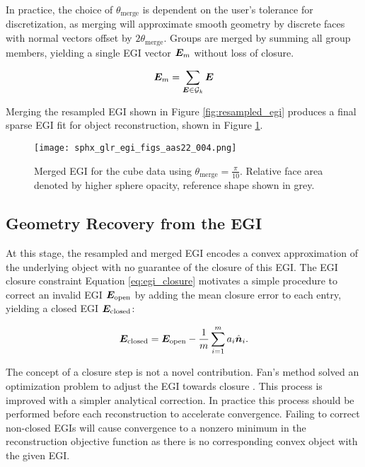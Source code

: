 In practice, the choice of $\theta_\mathrm{merge}$ is dependent on the user's tolerance for discretization, as merging will approximate smooth geometry by discrete faces with normal vectors offset by $2\theta_\mathrm{merge}$. Groups are merged by summing all group members, yielding a single EGI vector $\bm{E}_m$ without loss of closure. 

\begin{equation} \label{eq:fixing_egi}
  \bm{E}_m = \sum_{\bm{E} \in \mathcal{G}_k}{\bm{E}}
\end{equation}

Merging the resampled EGI shown in Figure \ref{fig:resampled_egi} produces a final sparse EGI fit for object reconstruction, shown in Figure \ref{fig:merged_egi}. 

\begin{figure}[!htb]
  \centering
  \texttt{[image: sphx\_glr\_egi\_figs\_aas22\_004.png]}
  \caption{Merged EGI for the cube data using $\theta_\mathrm{merge} = \frac{\pi}{10}$. Relative face area denoted by higher sphere opacity, reference shape shown in grey.}
  \label{fig:merged_egi}
\end{figure}

\subsection{Geometry Recovery from the EGI}

At this stage, the resampled and merged EGI encodes a convex approximation of the underlying object with no guarantee of the closure of this EGI. The EGI closure constraint Equation \ref{eq:egi_closure} motivates a simple procedure to correct an invalid EGI $\bm{E}_\mathrm{open}$ by adding the mean closure error to each entry, yielding a closed EGI $\bm{E}_\mathrm{closed}$:

\begin{equation} \label{eq:egi_validation}
  \bm{E}_\mathrm{closed} = \bm{E}_\mathrm{open} - \frac{1}{m}\sum_{i=1}^m a_i \hat{\bm{n}}_i .
\end{equation}

The concept of a closure step is not a novel contribution. Fan's method solved an optimization problem to adjust the EGI towards closure \cite{fan2020thesis}. This process is improved with a simpler analytical correction. In practice this process should be performed before each reconstruction to accelerate convergence. Failing to correct non-closed EGIs will cause convergence to a nonzero minimum in the reconstruction objective function as there is no corresponding convex object with the given EGI.

